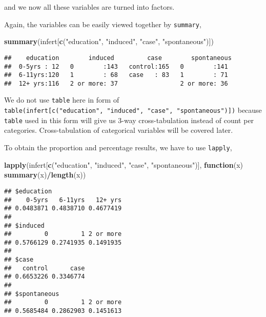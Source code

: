 \documentclass[]{book}
\newenvironment{Shaded}{\begin{snugshade}}{\end{snugshade}}
\newcommand{\KeywordTok}[1]{\textcolor[rgb]{0.13,0.29,0.53}{\textbf{#1}}}
\newcommand{\StringTok}[1]{\textcolor[rgb]{0.31,0.60,0.02}{#1}}
\newcommand{\ControlFlowTok}[1]{\textcolor[rgb]{0.13,0.29,0.53}{\textbf{#1}}}
\newcommand{\OperatorTok}[1]{\textcolor[rgb]{0.81,0.36,0.00}{\textbf{#1}}}
\newcommand{\NormalTok}[1]{#1}
\theoremstyle{definition}
\theoremstyle{definition}
\theoremstyle{remark}
\begin{document}
and we now all these variables are turned into factors.

Again, the variables can be easily viewed together by \texttt{summary},

\begin{Shaded}
\begin{Highlighting}[]
\KeywordTok{summary}\NormalTok{(infert[}\KeywordTok{c}\NormalTok{(}\StringTok{"education"}\NormalTok{, }\StringTok{"induced"}\NormalTok{, }\StringTok{"case"}\NormalTok{, }\StringTok{"spontaneous"}\NormalTok{)])}
\end{Highlighting}
\end{Shaded}

\begin{verbatim}
##    education        induced         case        spontaneous 
##  0-5yrs : 12   0        :143   control:165   0        :141  
##  6-11yrs:120   1        : 68   case   : 83   1        : 71  
##  12+ yrs:116   2 or more: 37                 2 or more: 36
\end{verbatim}

We do not use \texttt{table} here in form of
\texttt{table(infert{[}c("education",\ "induced",\ "case",\ "spontaneous"){]})}
because \texttt{table} used in this form will give us 3-way
cross-tabulation instead of count per categories. Cross-tabulation of
categorical variables will be covered later.

To obtain the proportion and percentage results, we have to use
\texttt{lapply},

\begin{Shaded}
\begin{Highlighting}[]
\KeywordTok{lapply}\NormalTok{(infert[}\KeywordTok{c}\NormalTok{(}\StringTok{"education"}\NormalTok{, }\StringTok{"induced"}\NormalTok{, }\StringTok{"case"}\NormalTok{, }\StringTok{"spontaneous"}\NormalTok{)], }\ControlFlowTok{function}\NormalTok{(x) }\KeywordTok{summary}\NormalTok{(x)}\OperatorTok{/}\KeywordTok{length}\NormalTok{(x))}
\end{Highlighting}
\end{Shaded}

\begin{verbatim}
## $education
##    0-5yrs   6-11yrs   12+ yrs 
## 0.0483871 0.4838710 0.4677419 
## 
## $induced
##         0         1 2 or more 
## 0.5766129 0.2741935 0.1491935 
## 
## $case
##   control      case 
## 0.6653226 0.3346774 
## 
## $spontaneous
##         0         1 2 or more 
## 0.5685484 0.2862903 0.1451613
\end{verbatim}
\end{document}
